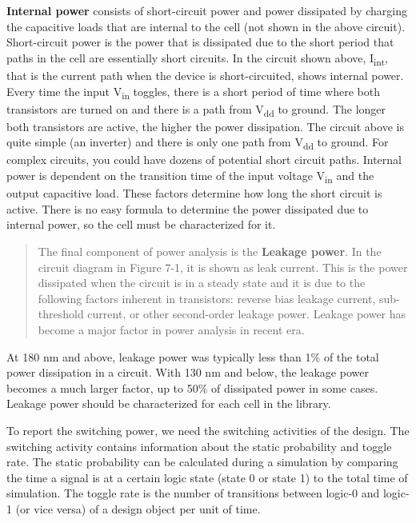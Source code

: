 \documentclass[
]{article}
\begin{document}
\textbf{Internal power} consists of short-circuit power and power
dissipated by charging the capacitive loads that are internal to the
cell (not shown in the above circuit). Short-circuit power is the power
that is dissipated due to the short period that paths in the cell are
essentially short circuits. In the circuit shown above,
I\textsubscript{int}, that is the current path when the device is
short-circuited, shows internal power. Every time the input
V\textsubscript{in} toggles, there is a short period of time where both
transistors are turned on and there is a path from V\textsubscript{dd}
to ground. The longer both transistors are active, the higher the power
dissipation. The circuit above is quite simple (an inverter) and there
is only one path from V\textsubscript{dd} to ground. For complex
circuits, you could have dozens of potential short circuit paths.
Internal power is dependent on the transition time of the input voltage
V\textsubscript{in} and the output capacitive load. These factors
determine how long the short circuit is active. There is no easy formula
to determine the power dissipated due to internal power, so the cell
must be characterized for it.

\begin{quote}
The final component of power analysis is the \textbf{Leakage power}. In
the circuit diagram in Figure 7-1, it is shown as leak current. This is
the power dissipated when the circuit is in a steady state and it is due
to the following factors inherent in transistors: reverse bias leakage
current, sub-threshold current, or other second-order leakage power.
Leakage power has become a major factor in power analysis in recent era.
\end{quote}

At 180 nm and above, leakage power was typically less than 1\% of the
total power dissipation in a circuit. With 130 nm and below, the leakage
power becomes a much larger factor, up to 50\% of dissipated power in
some cases. Leakage power should be characterized for each cell in the
library.

To report the switching power, we need the switching activities of the
design. The switching activity contains information about the static
probability and toggle rate. The static probability can be calculated
during a simulation by comparing the time a signal is at a certain logic
state (state 0 or state 1) to the total time of simulation. The toggle
rate is the number of transitions between logic-0 and logic-1 (or vice
versa) of a design object per unit of time.
\end{document}
